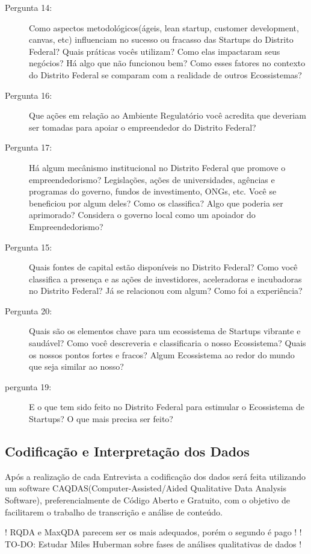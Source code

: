 \begin{description}
  \item [Pergunta 14:] Como aspectos metodológicos(ágeis, lean startup, customer development, canvas, etc) influenciam no sucesso ou fracasso das Startups do Distrito Federal? Quais práticas vocês utilizam? Como elas impactaram seus negócios? Há algo que não funcionou bem? Como esses fatores no contexto do Distrito Federal se comparam com a realidade de outros Ecossistemas?


  \item [Pergunta 16:] Que ações em relação ao Ambiente Regulatório você acredita que deveriam ser tomadas para apoiar o empreendedor do Distrito Federal?

  \item [Pergunta 17:] Há algum mecânismo institucional no Distrito Federal que promove o empreendedorismo? Legislações, ações de universidades, agências e programas do governo, fundos de investimento, ONGs, etc. Você se beneficiou por algum deles? Como os classifica? Algo que poderia ser aprimorado? Considera o governo local como um apoiador do Empreendedorismo?

  \item [Pergunta 15:] Quais fontes de capital estão disponíveis no Distrito Federal? Como você classifica a presença e as ações de investidores, aceleradoras e incubadoras no Distrito Federal? Já se relacionou com algum? Como foi a experiência?

  
  \item [Pergunta 20:] Quais são os elementos chave para um ecossistema de Startups vibrante e saudável? Como você descreveria e classificaria o nosso Ecossistema? Quais os nossos pontos fortes e fracos? Algum Ecossistema ao redor do mundo que seja similar ao nosso?

  \item [pergunta 19:] E o que tem sido feito no Distrito Federal para estimular o Ecossistema de Startups? O que mais precisa ser feito?
\end{description}

\subsection{Codificação e Interpretação dos Dados}
\label{subsection:codificacao_e_interpretacao_dos_dados}

Após a realização de cada Entrevista a codificação dos dados será feita utilizando um software CAQDAS(Computer-Assisted/Aided Qualitative Data Analysis Software), preferencialmente de Código Aberto e Gratuito, com o objetivo de facilitarem o trabalho de transcrição e análise de conteúdo. 

! RQDA e MaxQDA parecem ser os mais adequados, porém o segundo é pago ! 
! TO-DO: Estudar Miles Huberman sobre fases de análises qualitativas de dados !